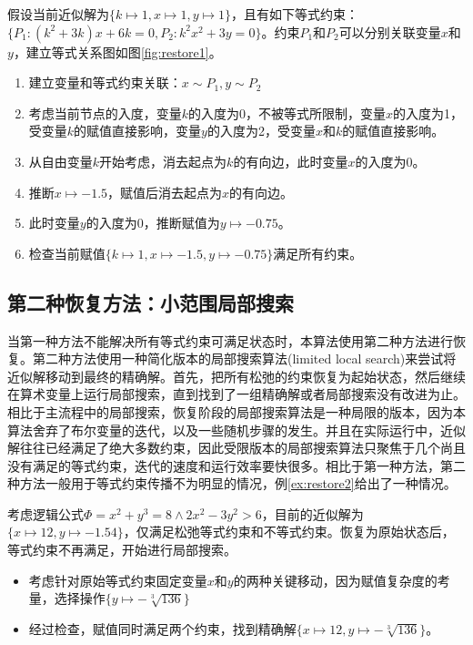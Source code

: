 \begin{example}
\label{ex:restore1}
假设当前近似解为$\{k \mapsto 1, x \mapsto 1, y \mapsto 1\}$，且有如下等式约束：$\{P_1: (k^2 + 3k) x + 6k = 0, P_2: k^2 x^2 + 3y = 0\}$。约束$P_1$和$P_2$可以分别关联变量$x$和$y$，建立等式关系图如图\ref{fig:restore1}。
\begin{enumerate}
    \item 建立变量和等式约束关联：$x \sim P_1, y \sim P_2$
    \item 考虑当前节点的入度，变量$k$的入度为0，不被等式所限制，变量$x$的入度为1，受变量$k$的赋值直接影响，变量$y$的入度为2，受变量$x$和$k$的赋值直接影响。
    \item 从自由变量$k$开始考虑，消去起点为$k$的有向边，此时变量$x$的入度为0。
    \item 推断$x \mapsto -1.5$，赋值后消去起点为$x$的有向边。
    \item 此时变量$y$的入度为0，推断赋值为$y \mapsto -0.75$。
    \item 检查当前赋值$\{k \mapsto 1, x \mapsto -1.5, y \mapsto -0.75\}$满足所有约束。
\end{enumerate}
\end{example}


\subsection{第二种恢复方法：小范围局部搜索}
当第一种方法不能解决所有等式约束可满足状态时，本算法使用第二种方法进行恢复。第二种方法使用一种简化版本的局部搜索算法(limited local search)来尝试将近似解移动到最终的精确解。首先，把所有松弛的约束恢复为起始状态，然后继续在算术变量上运行局部搜索，直到找到了一组精确解或者局部搜索没有改进为止。相比于主流程中的局部搜索，恢复阶段的局部搜索算法是一种局限的版本，因为本算法舍弃了布尔变量的迭代，以及一些随机步骤的发生。并且在实际运行中，近似解往往已经满足了绝大多数约束，因此受限版本的局部搜索算法只聚焦于几个尚且没有满足的等式约束，迭代的速度和运行效率要快很多。相比于第一种方法，第二种方法一般用于等式约束传播不为明显的情况，例\ref{ex:restore2}给出了一种情况。

\begin{example}
考虑逻辑公式$\Phi = x^2 + y^3 = 8 \wedge 2x^2 - 3y^2 > 6$，目前的近似解为$\{x \mapsto 12, y \mapsto -1.54\}$，仅满足松弛等式约束和不等式约束。恢复为原始状态后，等式约束不再满足，开始进行局部搜索。
\begin{itemize}
    \item 考虑针对原始等式约束固定变量$x$和$y$的两种关键移动，因为赋值复杂度的考量，选择操作$\{y \mapsto -\sqrt[3]{136}\}$
    \item 经过检查，赋值同时满足两个约束，找到精确解$\{x \mapsto 12, y \mapsto -\sqrt[3]{136}\}$。
\end{itemize}
\label{ex:restore2}
\end{example}

